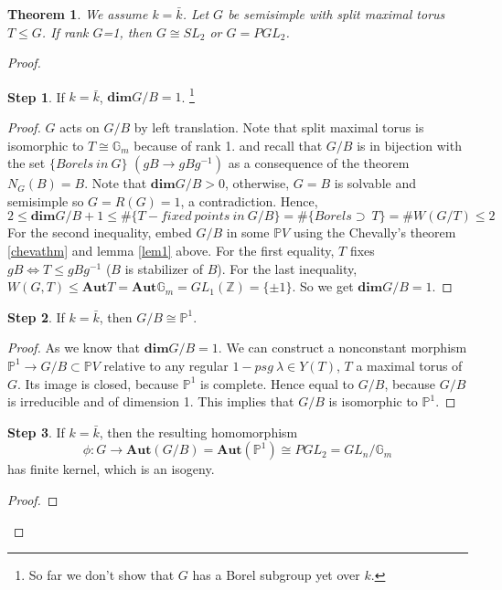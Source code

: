\documentclass[12pt,a4paper,english]{article}
\theoremstyle{plain}
\newtheorem{thm}{Theorem}[section]
\theoremstyle{definition}
\newtheorem{step}{Step}
\begin{document}
\begin{thm}
We assume $k=\bar{k}$. Let $G$ be semisimple with split maximal torus $T\leq G$. If rank $G$=1, then $G\cong SL_{2}$ or $G=PGL_{2}$.
\end{thm}
\begin{proof}
\begin{step}
If $k=\bar{k}$, $\textbf{dim}G/B=1$. \footnote{So far we don't show that $G$ has a Borel subgroup yet over $k$.}
\end{step}
\begin{proof}
$G$ acts on $G/B$ by left translation. Note that split maximal torus is isomorphic to $T\cong\mathbb{G}_{m}$ because of rank 1. and recall that $G/B$ is in bijection with the set $\{Borels\ in\ G\}$ $(gB\rightarrow gBg^{-1})$ as a consequence of the theorem $N_{G}(B)=B$. Note that $\textbf{dim}G/B>0$, otherwise, $G=B$ is solvable and semisimple so $G=R(G)=1$, a contradiction. Hence,
\begin{equation*}
    2\leq\textbf{dim}G/B+1\leq \#\{T- fixed\ points\ in\ G/B \}=\#\{Borels\supset\ T\}=\# W(G/T)\leq2
\end{equation*}
For the second inequality, embed $G/B$ in some $\mathbb{P}V$ using the Chevally's theorem \ref{chevathm} and lemma \ref{lem1} above. For the first equality, $T$ fixes $gB\Leftrightarrow T\leq gBg^{-1}$ ($B$ is stabilizer of $B$). For the last inequality, $W(G,T)\leq \textbf{Aut}T=\textbf{Aut}\mathbb{G}_{m}=GL_{1}(\mathbb{Z})=\{\pm1\}$. 
So we get $\textbf{dim}G/B=1 $. 
\end{proof}

\begin{step}\label{step2}
If $k=\bar{k}$, then $G/B\cong \mathbb{P}^{1}$.
\end{step}
\begin{proof}
As we know that $\textbf{dim} G/B=1$. We can construct a nonconstant morphism $\mathbb{P}^{1}\rightarrow G/B\subset \mathbb{P}V$ relative to any regular $1-psg\ \lambda\in Y(T)$, $T$ a maximal torus of $G$. Its image is closed, because $\mathbb{P}^{1}$ is complete. Hence equal to $G/B$, because $G/B$ is irreducible and of dimension 1. This implies that $G/B$ is isomorphic to $\mathbb{P}^{1}$. 
\end{proof}
\begin{step}\label{step3}
If $k=\bar{k}$, then the resulting homomorphism 
\begin{equation*}
    \phi:G\rightarrow \textbf{Aut}(G/B)=\textbf{Aut}(\mathbb{P}^{1})\cong PGL_{2}=GL_{n}/\mathbb{G}_{m}
\end{equation*}
has finite kernel, which is an isogeny.
\end{step}
\begin{proof}






\end{proof}
\end{proof}
\end{document}
